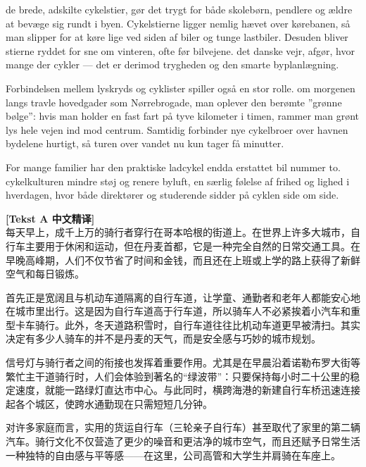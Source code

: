  de brede, adskilte cykelstier,  gør det trygt for både skolebørn, pendlere og ældre at bevæge sig rundt i byen. Cykelstierne ligger nemlig hævet over kørebanen, så man slipper for at køre lige ved siden af biler og tunge lastbiler. Desuden bliver stierne ryddet for sne om vinteren, ofte før bilvejene.  det danske vejr,  afgør, hvor mange der cykler --- det er derimod trygheden og den smarte byplanlægning.

Forbindelsen mellem lyskryds og cyklister spiller også en stor rolle.  om morgenen langs travle hovedgader som Nørrebrogade,  man oplever den berømte ”grønne bølge”: hvis man holder en fast fart på tyve kilometer i timen, rammer man grønt lys hele vejen ind mod centrum. Samtidig forbinder nye cykelbroer over havnen bydelene hurtigt, så turen over vandet nu kun tager få minutter.

For mange familier har den praktiske ladcykel endda erstattet bil nummer to.  cykelkulturen mindre støj og renere byluft,  en særlig følelse af frihed og lighed i hverdagen, hvor både direktører og studerende sidder på cyklen side om side.

\begin{transbox}
\small
\textbf{\color{NCDTeal}[Tekst A 中文精译]}\\
每天早上，成千上万的骑行者穿行在哥本哈根的街道上。在世界上许多大城市，自行车主要用于休闲和运动，但在丹麦首都，它是一种完全自然的日常交通工具。在早晚高峰期，人们不仅节省了时间和金钱，而且还在上班或上学的路上获得了新鲜空气和每日锻炼。

首先正是宽阔且与机动车道隔离的自行车道，让学童、通勤者和老年人都能安心地在城市里出行。这是因为自行车道高于行车道，所以骑车人不必紧挨着小汽车和重型卡车骑行。此外，冬天道路积雪时，自行车道往往比机动车道更早被清扫。其实决定有多少人骑车的并不是丹麦的天气，而是安全感与巧妙的城市规划。

信号灯与骑行者之间的衔接也发挥着重要作用。尤其是在早晨沿着诺勒布罗大街等繁忙主干道骑行时，人们会体验到著名的“绿波带”：只要保持每小时二十公里的稳定速度，就能一路绿灯直达市中心。与此同时，横跨海港的新建自行车桥迅速连接起各个城区，使跨水通勤现在只需短短几分钟。

对许多家庭而言，实用的货运自行车（三轮亲子自行车）甚至取代了家里的第二辆汽车。骑行文化不仅营造了更少的噪音和更洁净的城市空气，而且还赋予日常生活一种独特的自由感与平等感——在这里，公司高管和大学生并肩骑在车座上。
\end{transbox}

